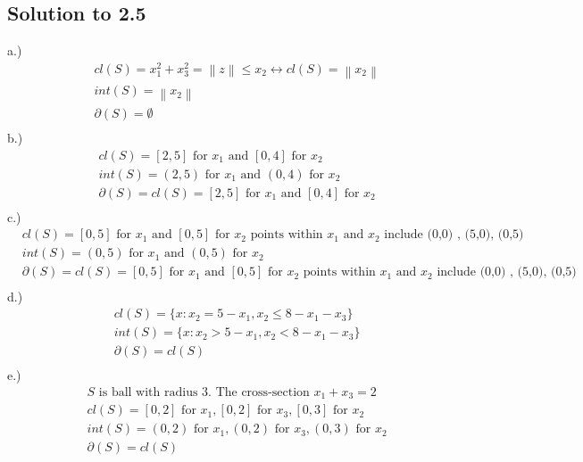 \documentclass[12pt]{article}
\begin{document}
\subsection{Solution to 2.5}
\quad \quad \quad  \quad a.)\\
        \begin{align*}
            &cl(S) = x_1^2 + x_3^2 = \left\| z \right\| \leq x_2 \leftrightarrow cl(S) = \left\| x_2 \right\| \\
            &int(S) = \left\| x_2 \right\|\\
            &\partial(S) = \emptyset \\    
        \end{align*}
\quad \quad \quad  \quad b.)\\
        \begin{align*}
            &cl(S) = [2,5] \text{ for } x_1 \text{ and } [0,4] \text{ for } x_2\\
            &int(S) = (2,5) \text{ for } x_1 \text{ and } (0,4) \text{ for } x_2\\
            &\partial(S) = cl(S) =[2,5] \text{ for } x_1 \text{ and } [0,4] \text{ for } x_2\\   
        \end{align*}
\quad \quad \quad  \quad c.)\\
        \begin{align*}
            &cl(S) = [0,5] \text{ for } x_1 \text{ and }[0,5] \text{ for } x_2 \text{ points within } x_1 \text{ and } x_2 \text{ include (0,0) , (5,0), (0,5) } \\
            &int(S) = (0,5) \text{ for } x_1 \text{ and } (0,5) \text{ for } x_2\\
            &\partial(S) = cl(S) = [0,5] \text{ for } x_1 \text{ and }[0,5] \text{ for } x_2 \text{ points within } x_1 \text{ and } x_2 \text{ include (0,0) , (5,0), (0,5) } \\    
        \end{align*}
\quad \quad \quad  \quad d.)\\
        \begin{align*}
            &cl(S) = \{ x: x_2 = 5-x_1, x_2 \leq 8-x_1 - x_3 \}\\
            &int(S) = \{ x: x_2 > 5-x_1, x_2 < 8-x_1 - x_3 \}\\
            &\partial(S) = cl(S)\\    
        \end{align*}   
\quad \quad \quad  \quad e.)\\
        \begin{align*}
            &S \text{ is ball with radius 3. The cross-section } x_1 + x_3 =2\\
            &cl(S) = [0,2] \text{ for } x_1 , [0,2] \text{ for } x_3, [0,3] \text{ for } x_2\\
            &int(S) = (0,2) \text{ for } x_1 , (0,2) \text{ for } x_3, (0,3) \text{ for } x_2\\
            &\partial(S) = cl(S)\\    
        \end{align*}
        
\end{document}

